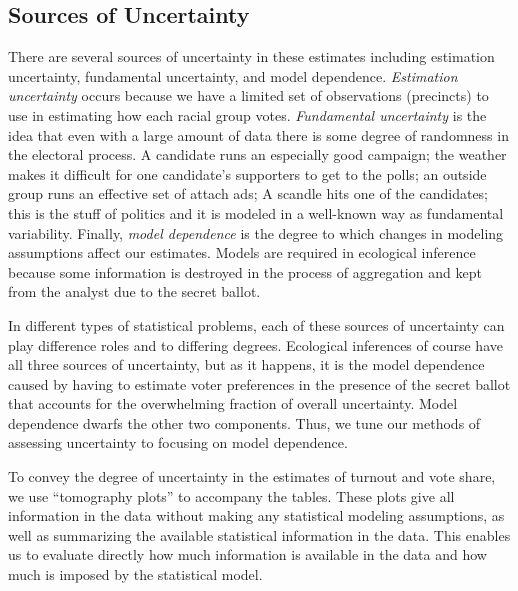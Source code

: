 \documentclass[12pt,draft]{scrartcl}
\begin{document}
\subsection{Sources of Uncertainty}

There are several sources of uncertainty in these estimates including
estimation uncertainty, fundamental uncertainty, and model dependence.
\emph{Estimation uncertainty} occurs because we have a limited set of
observations (precincts) to use in estimating how each racial group
votes.  \emph{Fundamental uncertainty} is the idea that even with a
large amount of data there is some degree of randomness in the
electoral process. A candidate runs an especially good campaign; the
weather makes it difficult for one candidate's supporters to get to
the polls; an outside group runs an effective set of attach ads; A
scandle hits one of the candidates; this is the stuff of politics and
it is modeled in a well-known way as fundamental variability.
Finally, \emph{model dependence} is the degree to which changes in
modeling assumptions affect our estimates.  Models are required in
ecological inference because some information is destroyed in the
process of aggregation and kept from the analyst due to the secret
ballot.

In different types of statistical problems, each of these sources of
uncertainty can play difference roles and to differing degrees.
Ecological inferences of course have all three sources of uncertainty,
but as it happens, it is the model dependence caused by having to
estimate voter preferences in the presence of the secret ballot that
accounts for the overwhelming fraction of overall uncertainty.  Model
dependence dwarfs the other two components. Thus, we tune our methods
of assessing uncertainty to focusing on model dependence.  

To convey the degree of uncertainty in the estimates of turnout and
vote share, we use ``tomography plots'' to accompany the tables.
These plots give all information in the data without making any
statistical modeling assumptions, as well as summarizing the available
statistical information in the data. This enables us to evaluate
directly how much information is available in the data and how much
is imposed by the statistical model.
\end{document}
